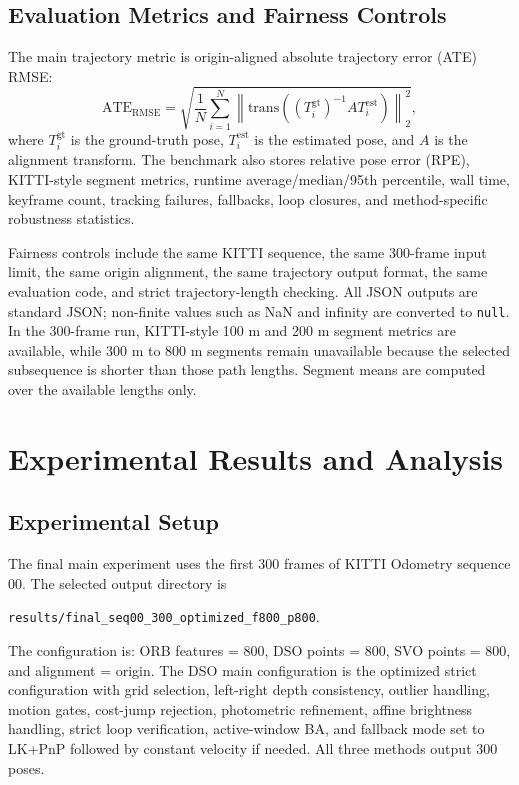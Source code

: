 \documentclass[11pt,a4paper]{article}
\begin{document}
\subsection{Evaluation Metrics and Fairness Controls}

The main trajectory metric is origin-aligned absolute trajectory error (ATE) RMSE:
\begin{equation}
  \mathrm{ATE}_{\mathrm{RMSE}} = \sqrt{\frac{1}{N}\sum_{i=1}^{N}\left\|\mathrm{trans}\left((T_i^{\mathrm{gt}})^{-1}AT_i^{\mathrm{est}}\right)\right\|_2^2},
\end{equation}
where $T_i^{\mathrm{gt}}$ is the ground-truth pose, $T_i^{\mathrm{est}}$ is the estimated pose, and $A$ is the alignment transform. The benchmark also stores relative pose error (RPE), KITTI-style segment metrics, runtime average/median/95th percentile, wall time, keyframe count, tracking failures, fallbacks, loop closures, and method-specific robustness statistics.

Fairness controls include the same KITTI sequence, the same 300-frame input limit, the same origin alignment, the same trajectory output format, the same evaluation code, and strict trajectory-length checking. All JSON outputs are standard JSON; non-finite values such as NaN and infinity are converted to \texttt{null}. In the 300-frame run, KITTI-style 100 m and 200 m segment metrics are available, while 300 m to 800 m segments remain unavailable because the selected subsequence is shorter than those path lengths. Segment means are computed over the available lengths only.

\section{Experimental Results and Analysis}

\subsection{Experimental Setup}

The final main experiment uses the first 300 frames of KITTI Odometry sequence 00. The selected output directory is
\begin{center}
\texttt{results/final\_seq00\_300\_optimized\_f800\_p800}.
\end{center}
The configuration is: ORB features = 800, DSO points = 800, SVO points = 800, and alignment = origin. The DSO main configuration is the optimized strict configuration with grid selection, left-right depth consistency, outlier handling, motion gates, cost-jump rejection, photometric refinement, affine brightness handling, strict loop verification, active-window BA, and fallback mode set to LK+PnP followed by constant velocity if needed. All three methods output 300 poses.
\end{document}

